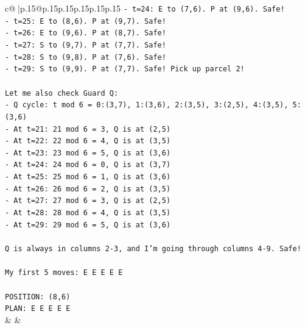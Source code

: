 \documentclass{article}
\begin{document}
{\begin{supertabular}{c@{$\;$}|p{.15\linewidth}@{}p{.15\linewidth}p{.15\linewidth}p{.15\linewidth}p{.15\linewidth}p{.15\linewidth}}
{{{\texttt{{-} t=24: E to (7,6). P at (9,6). Safe!} \\
\texttt{{-} t=25: E to (8,6). P at (9,7). Safe!} \\
\texttt{{-} t=26: E to (9,6). P at (8,7). Safe!} \\
\texttt{{-} t=27: S to (9,7). P at (7,7). Safe!} \\
\texttt{{-} t=28: S to (9,8). P at (7,6). Safe!} \\
\texttt{{-} t=29: S to (9,9). P at (7,7). Safe! Pick up parcel 2!} \\
\\ 
\texttt{Let me also check Guard Q:} \\
\texttt{{-} Q cycle: t mod 6 = 0:(3,7), 1:(3,6), 2:(3,5), 3:(2,5), 4:(3,5), 5:(3,6)} \\
\texttt{{-} At t=21: 21 mod 6 = 3, Q is at (2,5)} \\
\texttt{{-} At t=22: 22 mod 6 = 4, Q is at (3,5)} \\
\texttt{{-} At t=23: 23 mod 6 = 5, Q is at (3,6)} \\
\texttt{{-} At t=24: 24 mod 6 = 0, Q is at (3,7)} \\
\texttt{{-} At t=25: 25 mod 6 = 1, Q is at (3,6)} \\
\texttt{{-} At t=26: 26 mod 6 = 2, Q is at (3,5)} \\
\texttt{{-} At t=27: 27 mod 6 = 3, Q is at (2,5)} \\
\texttt{{-} At t=28: 28 mod 6 = 4, Q is at (3,5)} \\
\texttt{{-} At t=29: 29 mod 6 = 5, Q is at (3,6)} \\
\\ 
\texttt{Q is always in columns 2{-}3, and I'm going through columns 4{-}9. Safe!} \\
\\ 
\texttt{My first 5 moves: E E E E E} \\
\\ 
\texttt{POSITION: (8,6)} \\
\texttt{PLAN: E E E E E} \\
            }
        }
    }
    & & \\ \\


\end{supertabular}}
\end{document}
